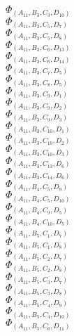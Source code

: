 \documentclass[14pt]{article}
\begin{document}
    $\Phi_{({A}_{11}, {B}_{3}, {C}_{3}, {D}_{10})}$ \\ 
    $\Phi_{({A}_{11}, {B}_{3}, {C}_{5}, {D}_{7})}$ \\ 
    $\Phi_{({A}_{11}, {B}_{3}, {C}_{5}, {D}_{8})}$ \\ 
    $\Phi_{({A}_{11}, {B}_{3}, {C}_{6}, {D}_{13})}$ \\ 
    $\Phi_{({A}_{11}, {B}_{3}, {C}_{6}, {D}_{14})}$ \\ 
    $\Phi_{({A}_{11}, {B}_{3}, {C}_{7}, {D}_{5})}$ \\ 
    $\Phi_{({A}_{11}, {B}_{3}, {C}_{8}, {D}_{5})}$ \\ 
    $\Phi_{({A}_{11}, {B}_{3}, {C}_{9}, {D}_{1})}$ \\ 
    $\Phi_{({A}_{11}, {B}_{3}, {C}_{9}, {D}_{2})}$ \\ 
    $\Phi_{({A}_{11}, {B}_{3}, {C}_{9}, {D}_{3})}$ \\ 
    $\Phi_{({A}_{11}, {B}_{3}, {C}_{10}, {D}_{1})}$ \\ 
    $\Phi_{({A}_{11}, {B}_{3}, {C}_{10}, {D}_{2})}$ \\ 
    $\Phi_{({A}_{11}, {B}_{3}, {C}_{10}, {D}_{3})}$ \\ 
    $\Phi_{({A}_{11}, {B}_{3}, {C}_{13}, {D}_{6})}$ \\ 
    $\Phi_{({A}_{11}, {B}_{3}, {C}_{14}, {D}_{6})}$ \\ 
    $\Phi_{({A}_{11}, {B}_{4}, {C}_{5}, {D}_{9})}$ \\ 
    $\Phi_{({A}_{11}, {B}_{4}, {C}_{5}, {D}_{10})}$ \\ 
    $\Phi_{({A}_{11}, {B}_{4}, {C}_{9}, {D}_{5})}$ \\ 
    $\Phi_{({A}_{11}, {B}_{4}, {C}_{10}, {D}_{5})}$ \\ 
    $\Phi_{({A}_{11}, {B}_{5}, {C}_{1}, {D}_{7})}$ \\ 
    $\Phi_{({A}_{11}, {B}_{5}, {C}_{1}, {D}_{8})}$ \\ 
    $\Phi_{({A}_{11}, {B}_{5}, {C}_{2}, {D}_{7})}$ \\ 
    $\Phi_{({A}_{11}, {B}_{5}, {C}_{2}, {D}_{8})}$ \\ 
    $\Phi_{({A}_{11}, {B}_{5}, {C}_{3}, {D}_{7})}$ \\ 
    $\Phi_{({A}_{11}, {B}_{5}, {C}_{3}, {D}_{8})}$ \\ 
    $\Phi_{({A}_{11}, {B}_{5}, {C}_{4}, {D}_{9})}$ \\ 
    $\Phi_{({A}_{11}, {B}_{5}, {C}_{4}, {D}_{10})}$ \\ 
    $\Phi_{({A}_{11}, {B}_{5}, {C}_{6}, {D}_{11})}$ \\ 
\end{document}
